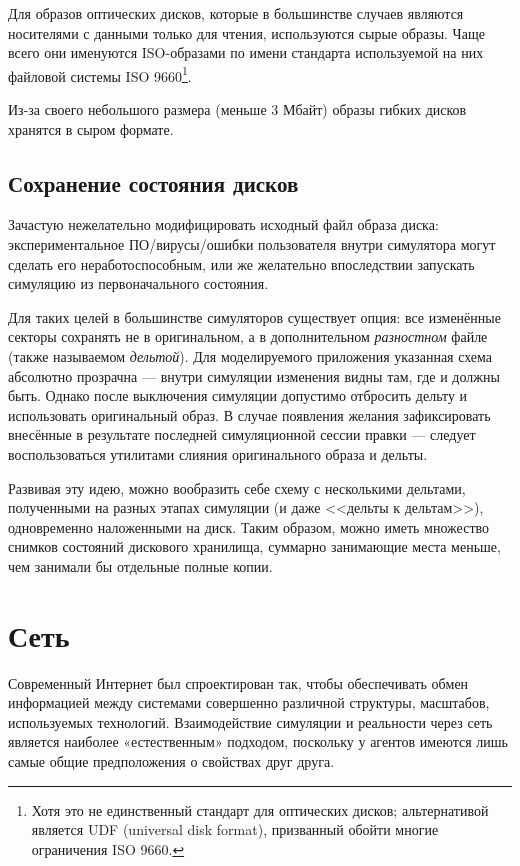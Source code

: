 Для образов оптических дисков, которые в большинстве  случаев являются носителями с данными только для чтения, используются сырые образы. Чаще всего они именуются ISO-образами по имени стандарта используемой на них файловой системы ISO 9660\footnote{Хотя это не единственный стандарт для оптических дисков; альтернативой является UDF (universal disk format), призванный обойти многие ограничения ISO 9660.}.

Из-за своего небольшого размера (меньше 3 Мбайт) образы гибких дисков хранятся в сыром формате.

\subsection{Сохранение состояния дисков}

Зачастую нежелательно модифицировать исходный файл образа диска: экспериментальное ПО/вирусы/ошибки пользователя внутри симулятора могут сделать его неработоспособным, или же желательно впоследствии запускать симуляцию из первоначального состояния.

Для таких целей в большинстве симуляторов существует опция: все изменённые секторы сохранять не в оригинальном, а в дополнительном \textit{разностном} файле (также называемом \textit{дельтой}). Для моделируемого приложения указанная схема абсолютно прозрачна — внутри симуляции изменения видны там, где и должны быть. Однако после выключения симуляции допустимо отбросить дельту и использовать оригинальный образ. В случае появления желания зафиксировать внесённые в результате последней симуляционной сессии правки — следует воспользоваться утилитами слияния оригинального образа и дельты.

Развивая эту идею, можно вообразить себе схему с несколькими дельтами, полученными на разных этапах симуляции (и даже <<дельты к дельтам>>), одновременно наложенными на диск. Таким образом, можно иметь множество снимков состояний дискового хранилища, суммарно занимающие места меньше, чем занимали бы отдельные полные копии.

\section{Сеть}

Современный Интернет был спроектирован так, чтобы обеспечивать обмен информацией между системами совершенно различной структуры, масштабов, используемых технологий. Взаимодействие симуляции и реальности через сеть является наиболее «естественным» подходом, поскольку у агентов имеются лишь самые общие предположения о свойствах друг друга.


